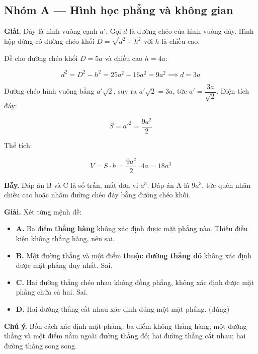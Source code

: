 \documentclass[11pt, a4paper]{article}
\begin{document}

\subsection*{Nhóm A — Hình học phẳng và không gian}

\begin{dapan}[1 — Đáp án D]
\textbf{Giải.} Đáy là hình vuông cạnh $a'$. Gọi $d$ là đường chéo của hình vuông đáy. Hình hộp đứng có đường chéo khối $D = \sqrt{d^2 + h^2}$ với $h$ là chiều cao.

Đề cho đường chéo khối $D = 5a$ và chiều cao $h = 4a$:

$$d^2 = D^2 - h^2 = 25a^2 - 16a^2 = 9a^2 \implies d = 3a$$

Đường chéo hình vuông bằng $a'\sqrt{2}$, suy ra $a'\sqrt{2} = 3a$, tức $a' = \dfrac{3a}{\sqrt{2}}$. Diện tích đáy:

$$S = a'^2 = \frac{9a^2}{2}$$

Thể tích:

$$V = S \cdot h = \frac{9a^2}{2} \cdot 4a = 18a^3$$

\textbf{Bẫy.} Đáp án B và C là số trần, mất đơn vị $a^3$. Đáp án A là $9a^3$, tức quên nhân chiều cao hoặc nhầm đường chéo đáy bằng đường chéo khối.
\end{dapan}

\begin{dapan}[2 — Đáp án D]
\textbf{Giải.} Xét từng mệnh đề:

\begin{itemize}[leftmargin=1.4em, itemsep=2pt]
\item \textbf{A.} Ba điểm \textbf{thẳng hàng} không xác định được mặt phẳng nào. Thiếu điều kiện không thẳng hàng, nên sai.
\item \textbf{B.} Một đường thẳng và một điểm \textbf{thuộc đường thẳng đó} không xác định được mặt phẳng duy nhất. Sai.
\item \textbf{C.} Hai đường thẳng chéo nhau không đồng phẳng, không xác định được mặt phẳng chứa cả hai. Sai.
\item \textbf{D.} Hai đường thẳng cắt nhau xác định đúng một mặt phẳng. (đúng)
\end{itemize}


\textbf{Chú ý.} Bốn cách xác định mặt phẳng: ba điểm không thẳng hàng; một đường thẳng và một điểm nằm ngoài đường thẳng đó; hai đường thẳng cắt nhau; hai đường thẳng song song.
\end{dapan}
\end{document}
